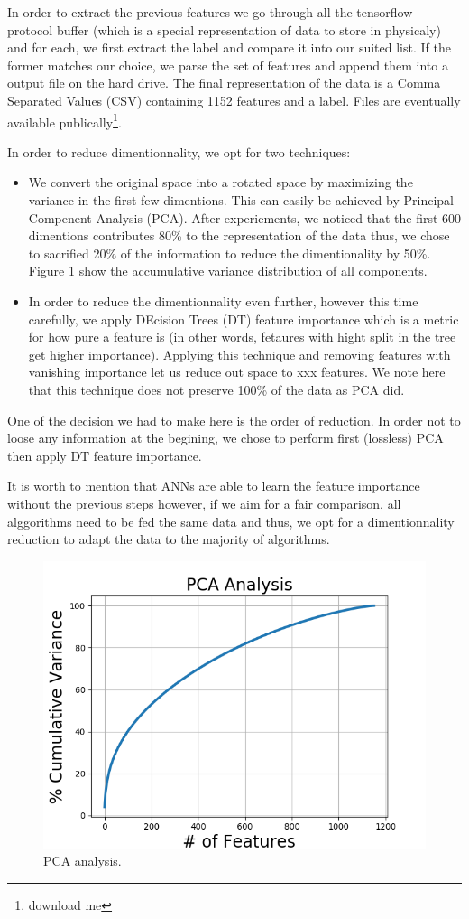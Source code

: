 \documentclass{article}
\begin{document}
In order to extract the previous features we go through all the tensorflow protocol buffer (which is a special representation of data to store in physicaly) and for each, we first extract the label and compare it into our suited list. If the former matches our choice, we parse the set of features and append them into a output file on the hard drive. The final representation of the data is a Comma Separated Values (CSV) containing 1152 features and a label. Files are eventually available publically\footnote{download me}.

In order to reduce dimentionnality, we opt for two techniques:
\begin{itemize}
\item We convert the original space into a rotated space by maximizing the variance in the first few dimentions. This can easily be achieved by Principal Compenent Analysis (PCA). After experiements, we noticed that the first 600 dimentions contributes 80\% to the representation of the data thus, we chose to sacrified 20\% of the information to reduce the dimentionality by 50\%. Figure \ref{fig:pca} show the accumulative variance distribution of all components.

\item In order to reduce the dimentionnality even further, however this time carefully, we apply DEcision Trees (DT) feature importance which is a metric for how pure a feature is (in other words, fetaures with hight split in the tree get higher importance). Applying this technique and removing features with vanishing importance let us reduce out space to xxx features. We note here that this technique does not preserve 100\% of the data as PCA did.
\end{itemize}

One of the decision we had to make here is the order of reduction. In order not to loose any information at the begining, we chose to perform first (lossless) PCA then apply DT feature importance.

It is worth to mention that ANNs are able to learn the feature importance without the previous steps however, if we aim for a fair comparison, all alggorithms need to be fed the same data and thus, we opt for a dimentionnality reduction to adapt the data to the majority of algorithms.

\begin{figure}
\center
  \includegraphics[width=0.5\linewidth]{img/PCA_Analysis}
  \caption{PCA analysis.}
  \label{fig:pca}
\end{figure}
\end{document}
